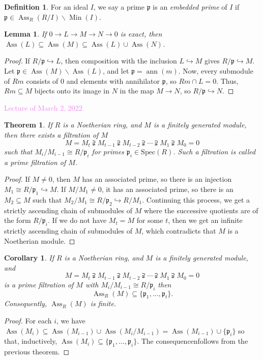 \documentclass{amsart}[12pt]
\def\Ass{\operatorname{Ass}}
\def\ann{\operatorname{ann}}
\def\Min{\operatorname{Min}}
\newcommand{\Mar}[1]{\textcolor{violet}{Lecture of March #1, 2022}}
\newcommand{\ZZ}{\mathbb{Z}}
\newcommand{\p}{{\mathfrak p}}
\newcommand{\DEF}[1]{\emph{#1}\index{#1}}
\numberwithin{equation}{section}
\theoremstyle{plain} %
\newtheorem{theorem}[equation]{Theorem}
\newtheorem{corollary}[equation]{Corollary}
\newtheorem{lemma}[equation]{Lemma}
\theoremstyle{definition}
\newtheorem{defn}[equation]{Definition}
\theoremstyle{remark}
\newcommand{\Spec}{\mathrm{Spec}}
\begin{document}
\begin{defn} For an ideal $I$, we say a prime $\p$ is an \DEF{embedded prime} of $I$ if $\p\in \Ass_R(R/I)\smallsetminus \Min(I)$.
\end{defn}

\begin{lemma}
	If $0\to L \to M \to N \to 0$ is exact, then $\Ass(L) \subseteq \Ass(M) \subseteq \Ass(L) \cup \Ass(N)$.
\end{lemma}
\begin{proof}
	If $R/\p \hookrightarrow L$, then composition with the inclusion $L\hookrightarrow M$ gives $R/\p \hookrightarrow M$. Let $\p\in \Ass(M)\smallsetminus \Ass(L)$, and let $\p=\ann(m)$. Now, every submodule of $Rm$ consists of $0$ and elements with annihilator $\p$, so $Rm\cap L=0$. Thus, $Rm \subseteq M$ bijects onto its image in $N$ in the map $M \to N$, so $R/\p \hookrightarrow N$.
\end{proof}

\Mar{2}


\begin{theorem}
	If $R$ is a Noetherian ring, and $M$ is a finitely generated module, then there exists a \emph{filtration} of $M$
	\[ M=M_t \supsetneqq M_{t-1} \supsetneqq M_{t-2} \supsetneqq \cdots \supsetneqq  M_1 \supsetneqq M_0 = 0 \]
	such that $M_i / M_{i-1} \cong R/\p_i$ for primes $\p_i\in \Spec(R)$. Such a filtration is called a \emph{prime filtration} of $M$.	
\end{theorem}
\begin{proof}
	If $M\neq 0$, then $M$ has an associated prime, so there is an injection $M_1\cong R/\p_1 \hookrightarrow M$. If $M/M_1\neq 0$, it has an associated prime, so there is an $M_2 \subseteq M$ such that  $M_2/M_1 \cong R/\p_2 \hookrightarrow R/M_1$. Continuing this process, we get a strictly ascending chain of submodules of $M$ where the successive quotients are of the form $R/\p_i$. If we do not have $M_t=M$ for some $t$, then we get an infinite strictly ascending chain of submodules of $M$, which contradicts that $M$ is a Noetherian module.
\end{proof}

\begin{corollary}
	If $R$ is a Noetherian ring, and $M$ is a finitely generated module, and \[M=M_t \supsetneqq M_{t-1} \supsetneqq M_{t-2} \supsetneqq \cdots \supsetneqq  M_1 \supsetneqq M_0 = 0\] is a prime filtration of $M$ with $M_i/M_{i-1}\cong R/\p_i$ then \[\Ass_R(M)\subseteq \{ \p_1, \dots, \p_t \}.\]
	Consequently, $\Ass_R(M)$ is finite.
\end{corollary}
\begin{proof}
For each $i$, we have $\Ass(M_i) \subseteq \Ass(M_{{i-1}})\cup \Ass(M_i/M_{i-1}) = \Ass(M_{{i-1}}) \cup \{\p_i\}$ so that, inductively, $\Ass(M_i)\subseteq\{\p_1,\dots,\p_i\}$. The consequencenfollows from the previous theorem.
\end{proof}
\end{document}
